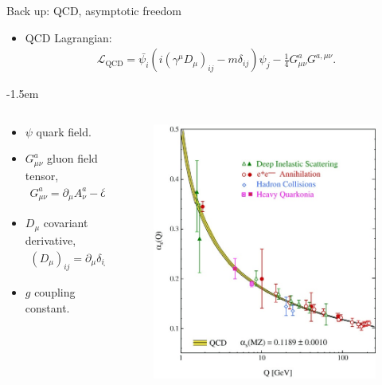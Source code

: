 \documentclass[11pt]{beamer}
\begin{document}
\begin{frame}[noframenumbering]{Back up: QCD, asymptotic freedom}
\begin{itemize}
\item QCD Lagrangian:
\begin{eqnarray}
\nonumber
\mathcal{L}_{\textrm{QCD}} = \bar{\psi_i}\left(i\left(\gamma^\mu D_\mu\right)_{ij} - m\delta_{ij}\right)\psi_j - \frac{1}{4}G^a_{\mu\nu}G^{a, \mu\nu}.
\end{eqnarray}
\end{itemize}
\kern-1.5em
\begin{columns}[onlytextwidth]
\begin{column}{0.55\textwidth}
\begin{itemize}
\item $\psi$ quark field.
\item $G^a_{\mu\nu}$ gluon field tensor,
\begin{eqnarray}
\nonumber
G^a_{\mu\nu} = \partial_\mu A^a_\nu - \partial_\nu A^a_\mu + g f^{abc}A^b_\mu A^c_\nu.
\end{eqnarray}
\item $D_\mu$ covariant derivative,
\begin{eqnarray}
\nonumber
\left(D_\mu\right)_{ij} = \partial_\mu \delta_{ij} - i g A^a_\mu t^a_{ij}.
\end{eqnarray}
\item $g$ coupling constant.
\end{itemize}
\end{column}

\begin{column}{0.45\textwidth}
\begin{center}
\begin{figure}
\includegraphics[width=0.8\columnwidth]{./pics/Running_coupling.jpg}
\end{figure}
\end{center}
\end{column}
\end{columns}

\end{frame}
\end{document}
